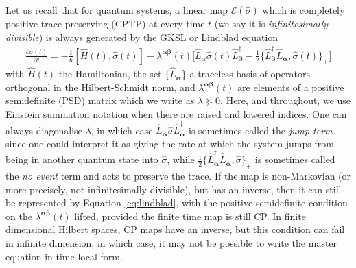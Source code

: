 \documentclass[aps,pra,showpacs,citeautoscript,amsmath,amssymb,floatfix,superscriptaddress,bbm, verbatim,amsfonts,changes,12pt,nofootinbib,longbibliography]{revtex4-2}
\newcommand{\ag}{{\boldsymbol\alpha}}
\newcommand{\bg}{{\boldsymbol\beta}}
\def\L{{\hat{L}}}
\begin{document}
Let us recall that for quantum systems,
a linear map $\mathcal{E}(\hat{\sigma})$  which is completely positive trace preserving (CPTP) at every time $t$ (we say it is {\it infinitesimally divisible}\cite{wolf2008dividing}) is always generated by the GKSL or Lindblad equation\cite{GKS76,Lindblad76}
\begin{align}
\frac{\partial\hat{\sigma}(t)}{\partial t}=-\frac{i}{\hbar}[\hat{H}(t) ,\hat{\sigma}(t)]-\lambda^{\ag\bg}(t)\big[\L_\alpha\hat{\sigma}(t)\L_\bg^\dagger-\frac{1}{2}\{\L_\bg^\dagger\L_\ag,\hat{\sigma}(t)\}_+\big]
\label{eq:lindblad}
\end{align}
with ${ \hat{H}(t)}$ the Hamiltonian, the set $\{\L_\ag$\} a traceless basis of operators orthogonal in the Hilbert-Schmidt norm, and $\lambda^{\ag\bg}(t)$ are elements of a positive semidefinite (PSD) matrix which we write as $\lambda\succeq 0$. Here, and throughout, we use Einstein summation notation when there are raised and lowered indices. One can always diagonalise $\lambda$, in which case $\L_\ag\hat{\sigma}\L_\ag^\dagger$ is sometimes called the {\it jump term} since one could interpret it as giving the rate at which
the system jumps from being in another quantum state into $\hat{\sigma}$, while 
$\frac{1}{2}\{\L_\ag^\dagger\L_\ag,\hat{\sigma}\}_+$ is sometimes called the {\it no event} term and acts to preserve the trace. If the map is non-Markovian (or more precisely, not infinitesimally divisible), but has an inverse, then it can still be represented by Equation \eqref{eq:lindblad}, with the positive semidefinite condition on the $\lambda^{\ag\bg}(t)$ lifted, provided the finite time map is still CP\cite{time-local}. In finite dimensional Hilbert spaces, CP maps have an inverse, but this condition can fail in infinite dimension\cite{buzek1998reconstruction,breuer1999stochastic}, in which case, it may not be possible to write the master equation in time-local form.
\end{document}
